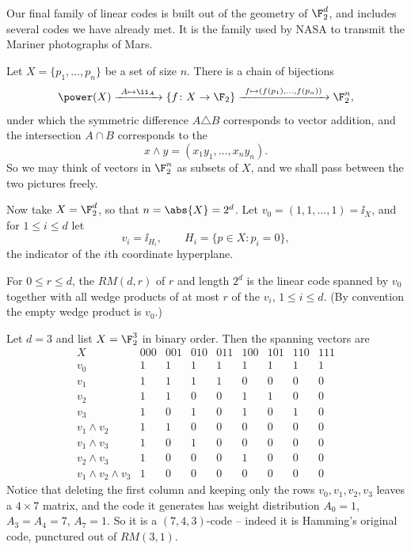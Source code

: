 Our final family of linear codes is built out of the geometry of $\F_2^d$, and includes several codes we have already met. It is the family used by NASA to transmit the Mariner photographs of Mars.

Let $X = \{p_1,\dots,p_n\}$ be a set of size $n$. There is a chain of bijections
$$\power(X) \xrightarrow{\ A \mapsto \ii_A\ } \{f\colon X \to \F_2\} \xrightarrow{\ f \mapsto (f(p_1),\dots,f(p_n))\ } \F_2^n,$$
under which the symmetric difference $A \triangle B$ corresponds to vector addition, and the intersection $A \cap B$ corresponds to the 
$$x \wedge y = (x_1y_1,\dots,x_ny_n).$$
So we may think of vectors in $\F_2^n$ as subsets of $X$, and we shall pass between the two pictures freely.

Now take $X = \F_2^d$, so that $n = \abs{X} = 2^d$. Let $v_0 = (1,1,\dots,1) = \ii_X$, and for $1 \le i \le d$ let
$$v_i = \ii_{H_i}, \qquad H_i = \{p \in X : p_i = 0\},$$
the indicator of the $i$th coordinate hyperplane.

\begin{definition}
	For $0 \le r \le d$, the  $RM(d,r)$ of  $r$ and length $2^d$ is the linear code spanned by $v_0$ together with all wedge products of at most $r$ of the $v_i$, $1 \le i \le d$. (By convention the empty wedge product is $v_0$.)
\end{definition}

\begin{example}\label{ex:rm3}
	Let $d = 3$ and list $X = \F_2^3$ in binary order. Then the spanning vectors are
	$$\begin{array}{c|cccccccc}
		X & 000&001&010&011&100&101&110&111\\\hline
		v_0 & 1&1&1&1&1&1&1&1\\
		v_1 & 1&1&1&1&0&0&0&0\\
		v_2 & 1&1&0&0&1&1&0&0\\
		v_3 & 1&0&1&0&1&0&1&0\\
		v_1\wedge v_2 & 1&1&0&0&0&0&0&0\\
		v_1\wedge v_3 & 1&0&1&0&0&0&0&0\\
		v_2\wedge v_3 & 1&0&0&0&1&0&0&0\\
		v_1\wedge v_2\wedge v_3 & 1&0&0&0&0&0&0&0
	\end{array}$$
	Notice that deleting the first column and keeping only the rows $v_0, v_1, v_2, v_3$ leaves a $4\times7$ matrix, and the code it generates has weight distribution $A_0 = 1$, $A_3 = A_4 = 7$, $A_7 = 1$. So it is a $(7,4,3)$-code -- indeed it is Hamming's original code, punctured out of $RM(3,1)$.
\end{example}

